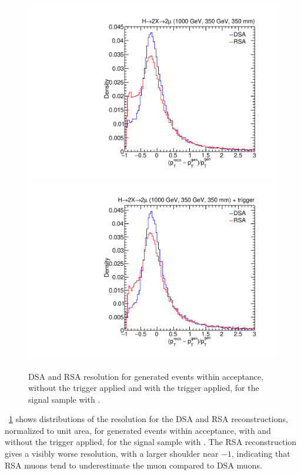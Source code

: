 \begin{figure}[p]
  \centering
  \includegraphics[width=\DSquareWidth]{figures/displaced/PTRES_2Mu2J_1000_350_350.pdf}
  \hspace*{-2em}
  \includegraphics[width=\DSquareWidth]{figures/displaced/PTRES_Trig_2Mu2J_1000_350_350.pdf}
  \caption[DSA and RSA \pT resolution for generated events within acceptance]{DSA and RSA \pT resolution for generated events within acceptance,  without the trigger applied and  with the trigger applied, for the \twoMu signal sample with .}
  \label{fig:dd:PTRES_DSA_RSA}
\end{figure}


\Fig~\ref{fig:dd:PTRES_DSA_RSA} shows distributions of the \pT resolution for the DSA and RSA reconstructions, normalized to unit area, for generated events within acceptance, with and without the trigger applied, for the \twoMu signal sample with .
The RSA reconstruction gives a visibly worse \pT resolution, with a larger shoulder near $-1$, indicating that RSA muons tend to underestimate the muon \pT compared to DSA muons.


